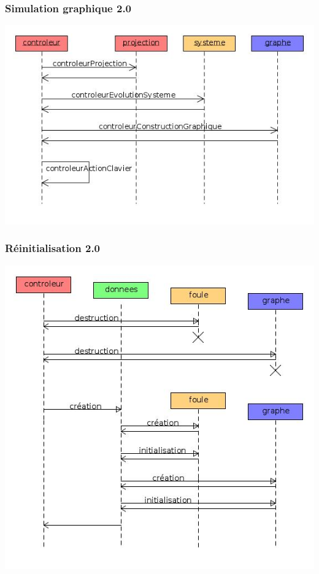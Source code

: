 \subsubsection{Simulation graphique 2.0}
\includegraphics[width=.95\textwidth]{./illustration/sequenceControleur}
%
\newpage
%
\subsubsection{Réinitialisation 2.0}
\includegraphics[width=.75\textwidth]{./illustration/sequenceReinitialisation2}

